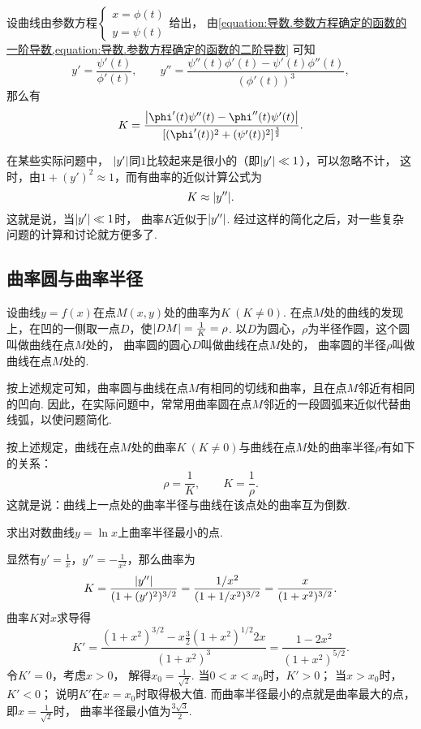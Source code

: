 设曲线由参数方程\(\left\{ \begin{array}{c}
	x = \phi(t) \\
	y = \psi(t)
\end{array} \right.\)给出，
由\cref{equation:导数.参数方程确定的函数的一阶导数,equation:导数.参数方程确定的函数的二阶导数}
可知\[
	y' = \frac{\psi'(t)}{\phi'(t)}, \qquad
	y'' = \frac{\psi''(t) \phi'(t) - \psi'(t) \phi''(t)}{(\phi'(t))^3},
\]
那么有\begin{equation}
	K = \frac{
		\abs{\phi'(t)\psi''(t)-\phi''(t)\psi'(t)}
	}{
		[(\phi'(t))^2+(\psi'(t))^2]^{\frac32}
	}.
\end{equation}

在某些实际问题中，
\(\abs{y'}\)同\(1\)比较起来是很小的（即\(\abs{y'} \ll 1\)），可以忽略不计，
这时，由\(1 + (y')^2 \approx 1\)，而有曲率的近似计算公式为\[
	K \approx \abs{y''}.
\]
这就是说，当\(\abs{y'} \ll 1\)时，
曲率\(K\)近似于\(\abs{y''}\).
经过这样的简化之后，对一些复杂问题的计算和讨论就方便多了.

\subsection{曲率圆与曲率半径}
设曲线\(y=f(x)\)在点\(M(x,y)\)处的曲率为\(K\ (K\neq0)\).
在点\(M\)处的曲线的发现上，在凹的一侧取一点\(D\)，使\(\abs{DM} = \frac{1}{K} = \rho\).
以\(D\)为圆心，\(\rho\)为半径作圆，这个圆叫做曲线在点\(M\)处的，
曲率圆的圆心\(D\)叫做曲线在点\(M\)处的，
曲率圆的半径\(\rho\)叫做曲线在点\(M\)处的.

按上述规定可知，曲率圆与曲线在点\(M\)有相同的切线和曲率，且在点\(M\)邻近有相同的凹向.
因此，在实际问题中，常常用曲率圆在点\(M\)邻近的一段圆弧来近似代替曲线弧，以使问题简化.

按上述规定，曲线在点\(M\)处的曲率\(K\ (K\neq0)\)与曲线在点\(M\)处的曲率半径\(\rho\)有如下的关系：\[
	\rho = \frac{1}{K}, \qquad K = \frac{1}{\rho}.
\]
这就是说：曲线上一点处的曲率半径与曲线在该点处的曲率互为倒数.

\begin{example}
求出对数曲线\(y = \ln x\)上曲率半径最小的点.
\begin{solution}
显然有\(y' = \frac{1}{x}\)，\(y'' = -\frac{1}{x^2}\)，那么曲率为\[
	K = \frac{\abs{y''}}{(1+(y')^2)^{3/2}}
	= \frac{1/x^2}{(1+1/x^2)^{3/2}}
	= \frac{x}{(1+x^2)^{3/2}}.
\]
曲率\(K\)对\(x\)求导得\[
	K' = \frac{(1+x^2)^{3/2} - x \frac{3}{2} (1+x^2)^{1/2} 2x}{(1+x^2)^3}
	= \frac{1 - 2x^2}{(1+x^2)^{5/2}}.
\]
令\(K' = 0\)，考虑\(x>0\)，
解得\(x_0 = \frac{1}{\sqrt{2}}\).
当\(0<x<x_0\)时，\(K'>0\)；
当\(x>x_0\)时，\(K'<0\)；
说明\(K'\)在\(x=x_0\)时取得极大值.
而曲率半径最小的点就是曲率最大的点，
即\(x = \frac{1}{\sqrt{2}}\)时，
曲率半径最小值为\(\frac{3\sqrt{3}}{2}\).
\end{solution}
\end{example}

